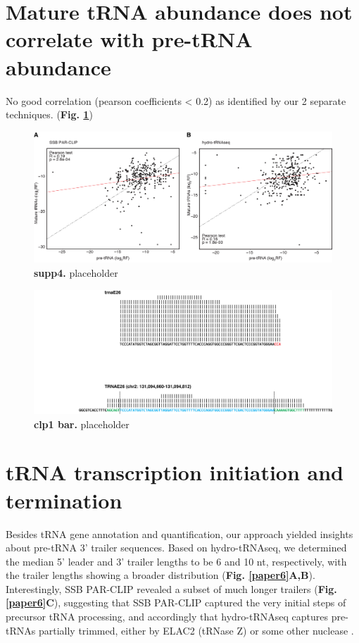 \documentclass[12pt]{rockefeller}
\begin{document}
\section{Mature tRNA abundance does not correlate with pre-tRNA abundance}
No good correlation (pearson coefficients < 0.2) as identified by our 2 separate techniques. (\textbf{Fig. \ref{supp4}})

\begin{figure}[!ht]%
\centering
\includegraphics[width=\textwidth]{supp4.png}%
\caption[supp4]
{\textbf{supp4.}
placeholder}
\centering
\label{supp4}%
\end{figure}	

\begin{figure}[!ht]%
\centering
\includegraphics[width=\textwidth]{hierarchical_mapping.png}%
\caption[clp1 bar]
{\textbf{clp1 bar.}
placeholder}
\centering
\label{hierarchical}%
\end{figure}


\section{tRNA transcription initiation and termination}

Besides tRNA gene annotation and quantification, our approach yielded insights about pre-tRNA 3’ trailer sequences. Based on hydro-tRNAseq, we determined the median 5’ leader and 3’ trailer lengths to be 6 and 10 nt, respectively, with the trailer lengths showing a broader distribution (\textbf{Fig. \ref{paper6}A,B}). Interestingly, SSB PAR-CLIP revealed a subset of much longer trailers (\textbf{Fig. \ref{paper6}C}), suggesting that SSB PAR-CLIP captured the very initial steps of precursor tRNA processing, and accordingly that hydro-tRNAseq captures pre-tRNAs partially trimmed, either by ELAC2 (tRNase Z) or some other nuclease \cite{Phizicky:2010jf}.
\end{document}
